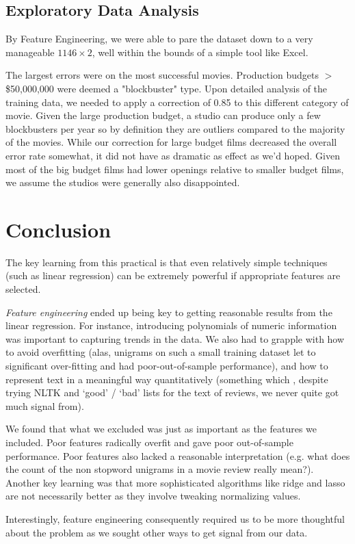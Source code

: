 \documentclass[11pt, oneside]{article}   	%
\begin{document}
\subsection*{Exploratory Data Analysis}

By Feature Engineering, we were able to pare the dataset down to a very manageable $1146 \times 2$, well within the bounds of a simple tool like Excel.

The largest errors were on the most successful movies. Production budgets $>$ {\$50,000,000} were deemed a "blockbuster" type. Upon detailed analysis of the training data, we needed to apply a correction of 0.85 to this different category of movie. Given the large production budget, a studio can produce only a few blockbusters per year so by definition they are outliers compared to the majority of the movies. While our correction for large budget films decreased the overall error rate somewhat, it did not have as dramatic as effect as we'd hoped. Given most of the big budget films had lower openings relative to smaller budget films, we assume the studios were generally also disappointed.

\section*{Conclusion}
The key learning from this practical is that even relatively simple techniques (such as linear regression) can be extremely powerful if appropriate features are selected. 

\emph{Feature engineering} ended up being key to getting reasonable results from the linear regression. For instance, introducing polynomials of numeric information was important to capturing trends in the data. We also had to grapple with how to avoid overfitting (alas, unigrams on such a small training dataset let to significant over-fitting and had poor-out-of-sample performance), and how to represent text in a meaningful way quantitatively (something which , despite trying NLTK and `good' / `bad' lists for the text of reviews, we never quite got much signal from).

We found that what we excluded was just as important as the features we included. Poor features radically overfit and gave poor out-of-sample performance. Poor features also lacked a reasonable interpretation (e.g. what does the count of the non stopword unigrams in a movie review really mean?). Another key learning was that more sophisticated algorithms like ridge and lasso are not necessarily better as they involve tweaking normalizing values.

Interestingly, feature engineering consequently required us to be more thoughtful about the problem as we sought other ways to get signal from our data. 
\end{document}

